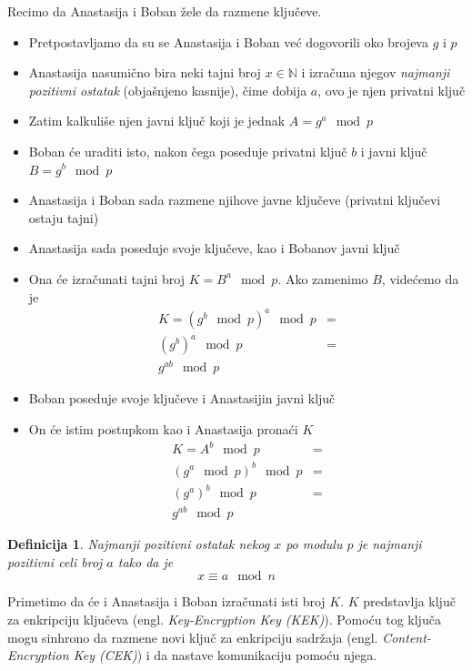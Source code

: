 \documentclass[a4paper]{article}
\newtheorem{defn}[primer]{Definicija}
\begin{document}
{Recimo da Anastasija i Boban žele da razmene ključeve.
\begin{itemize}
    \item Pretpostavljamo da su se Anastasija i Boban već dogovorili oko brojeva $g$ i $p$
    \item Anastasija nasumično bira neki tajni broj $x \in \mathbb{N}$ i izračuna njegov \emph{najmanji pozitivni ostatak} 
        (objašnjeno kasnije), čime dobija  $a$, ovo je njen privatni ključ
    \item Zatim kalkuliše njen javni ključ koji je jednak $A = g^a \mod p$ 
    \item Boban će uraditi isto, nakon čega poseduje privatni ključ $b$ i javni ključ $B = g^b \mod p$
    \item Anastasija i Boban sada razmene njihove javne ključeve (privatni ključevi ostaju tajni)
    \item Anastasija sada poseduje svoje ključeve, kao i Bobanov javni ključ
    \item Ona će izračunati tajni broj $K = B^a \mod p$. Ako zamenimo $B$, videćemo da je
        \begin{align*}
            K = (g^b \mod p)^a \mod p &=\\ (g^b)^a \mod p &=\\ g^{ab} \mod p
        \end{align*}
    \item Boban poseduje svoje ključeve i Anastasijin javni ključ
    \item On će istim postupkom kao i Anastasija pronaći $K$
        \begin{align*}
            K = A^b \mod p &=\\ (g^a \mod p)^b \mod p &=\\ (g^a)^b \mod p &=\\ g^{ab} \mod p
        \end{align*}
\end{itemize}

\begin{defn}
    Najmanji pozitivni ostatak nekog $x$ po modulu $p$ je najmanji pozitivni celi broj $a$ tako da je 
    \[x \equiv a \mod n\]
\end{defn}

Primetimo da će i Anastasija i Boban izračunati isti broj $K$. 
$K$ predstavlja ključ za enkripciju ključeva (engl. \emph{Key-Encryption Key (KEK)}). 
Pomoću tog ključa mogu sinhrono da razmene novi ključ za enkripciju sadržaja 
(engl. \emph{Content-Encryption Key (CEK)}) i da nastave komunikaciju pomoću njega. \cite{dhstandard}

}
\end{document}
